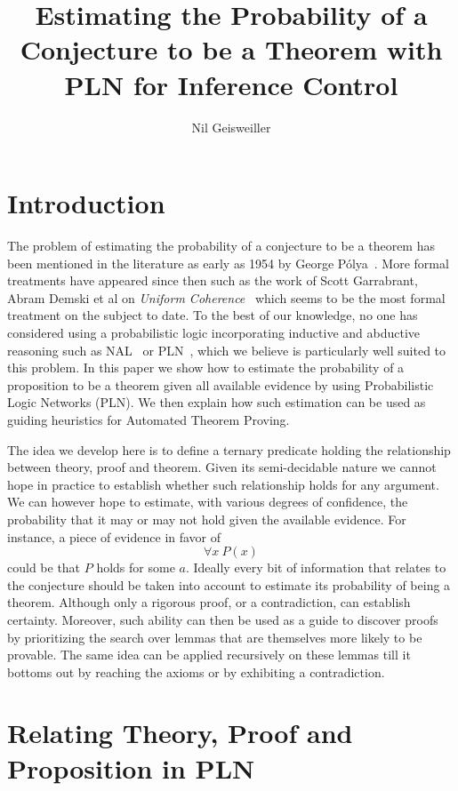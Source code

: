 \documentclass{easychair}
\title{Estimating the Probability of a Conjecture to be a Theorem with
  PLN for Inference Control}
\author{Nil Geisweiller}
\institute{
  SingularityNET Foundation,\\
  Zug, Switzerland\\
  \email{nil@singularitynet.io}
}
\begin{document}
\maketitle


\section{Introduction}

The problem of estimating the probability of a conjecture to be a
theorem has been mentioned in the literature as early as 1954 by
George P\'olya~\cite{Polya1954}.  More formal treatments have appeared
since then such as the work of Scott Garrabrant, Abram Demski et al on
\emph{Uniform Coherence}~\cite{Garrabrant2016, Abram2016} which seems
to be the most formal treatment on the subject to date.  To the best
of our knowledge, no one has considered using a probabilistic logic
incorporating inductive and abductive reasoning such as
NAL~\cite{Wang2013} or PLN~\cite{Goertzel09PLN}, which we believe is
particularly well suited to this problem.  In this paper we show how
to estimate the probability of a proposition to be a theorem given all
available evidence by using Probabilistic Logic Networks (PLN).  We
then explain how such estimation can be used as guiding heuristics for
Automated Theorem Proving.

The idea we develop here is to define a ternary predicate holding the
relationship between theory, proof and theorem.  Given its
semi-decidable nature we cannot hope in practice to establish whether
such relationship holds for any argument.  We can however hope to
estimate, with various degrees of confidence, the probability that it
may or may not hold given the available evidence.  For instance, a
piece of evidence in favor of
$$\forall x \ P(x)$$ could be that $P$ holds for some $a$.  Ideally
every bit of information that relates to the conjecture should be
taken into account to estimate its probability of being a theorem.
Although only a rigorous proof, or a contradiction, can establish
certainty.  Moreover, such ability can then be used as a guide to
discover proofs by prioritizing the search over lemmas that are
themselves more likely to be provable.  The same idea can be applied
recursively on these lemmas till it bottoms out by reaching the axioms
or by exhibiting a contradiction.

\section{Relating Theory, Proof and Proposition in PLN}
\end{document}
